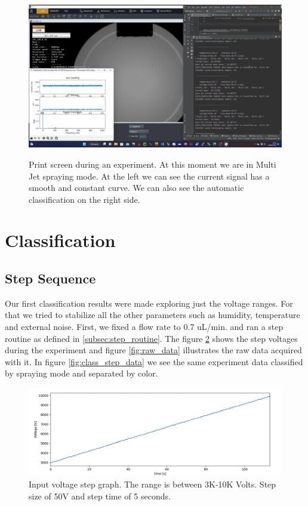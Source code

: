\begin{figure}[H]
    \center
    {\includegraphics[width=17cm]{Figuras/19:03/axs2.png}}
    \caption{Print screen during an experiment. At this moment we are in Multi Jet spraying mode. At the left we can see the current signal has a smooth and constant curve. We can also see the automatic classification on the right side.}
    \label{fig:multi_class_exp}
\end{figure}


\section{Classification}
\label{sec:classification_results}

\subsection{Step Sequence}
\label{subsec:step_results}

Our first classification results were made exploring just the voltage ranges. For that we tried to stabilize all the other parameters such as humidity, temperature and external noise.
First, we fixed a flow rate to 0.7 uL/min. and ran a step routine as defined in \ref{subsec:step_routine}. The figure \ref{fig:step_voltage} shows the step voltages during the experiment and figure \ref{fig:raw_data} illustrates the raw data acquired with it. In figure \ref{fig:class_step_data} we see the same experiment data classified by spraying mode and separated by color.


\begin{figure}[H]
    \center
    \includegraphics[width=12cm]{Figuras/19:03/voltage_step.png}
    \caption{Input voltage step graph. The range is between 3K-10K Volts. Step size of 50V and step time of 5 seconds.}
    \label{fig:step_voltage}
\end{figure}


